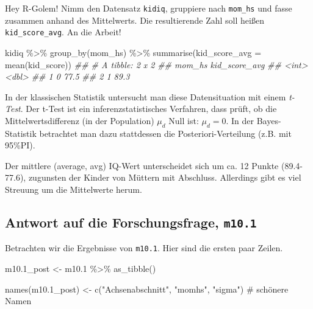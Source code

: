 \documentclass[
  a4paper,
  DIV=11]{scrreprt}
\newenvironment{Shaded}{\begin{snugshade}}{\end{snugshade}}
\newcommand{\AttributeTok}[1]{\textcolor[rgb]{0.40,0.45,0.13}{#1}}
\newcommand{\CommentTok}[1]{\textcolor[rgb]{0.37,0.37,0.37}{#1}}
\newcommand{\DocumentationTok}[1]{\textcolor[rgb]{0.37,0.37,0.37}{\textit{#1}}}
\newcommand{\FloatTok}[1]{\textcolor[rgb]{0.68,0.00,0.00}{#1}}
\newcommand{\FunctionTok}[1]{\textcolor[rgb]{0.28,0.35,0.67}{#1}}
\newcommand{\NormalTok}[1]{\textcolor[rgb]{0.00,0.23,0.31}{#1}}
\newcommand{\OtherTok}[1]{\textcolor[rgb]{0.00,0.23,0.31}{#1}}
\newcommand{\SpecialCharTok}[1]{\textcolor[rgb]{0.37,0.37,0.37}{#1}}
\newcommand{\StringTok}[1]{\textcolor[rgb]{0.13,0.47,0.30}{#1}}
\theoremstyle{definition}
\theoremstyle{remark}
\begin{document}
Hey R-Golem! Nimm den Datensatz \texttt{kidiq}, gruppiere nach
\texttt{mom\_hs} und fasse zusammen anhand des Mittelwerts. Die
resultierende Zahl soll heißen \texttt{kid\_score\_avg}. An die Arbeit!

\begin{Shaded}
\begin{Highlighting}[]
\NormalTok{kidiq }\SpecialCharTok{\%\textgreater{}\%} 
  \FunctionTok{group\_by}\NormalTok{(mom\_hs) }\SpecialCharTok{\%\textgreater{}\%} 
  \FunctionTok{summarise}\NormalTok{(}\AttributeTok{kid\_score\_avg =} 
              \FunctionTok{mean}\NormalTok{(kid\_score))}
\DocumentationTok{\#\# \# A tibble: 2 x 2}
\DocumentationTok{\#\#   mom\_hs kid\_score\_avg}
\DocumentationTok{\#\#    \textless{}int\textgreater{}         \textless{}dbl\textgreater{}}
\DocumentationTok{\#\# 1      0          77.5}
\DocumentationTok{\#\# 2      1          89.3}
\end{Highlighting}
\end{Shaded}

In der klassischen Statistik untersucht man diese Datensituation mit
einem \emph{t-Test}. Der t-Test ist ein inferenzstatistisches Verfahren,
dass prüft, ob die Mittelwertsdifferenz (in der Population) \(\mu_d\)
Null ist: \(\mu_d = 0\). In der Bayes-Statistik betrachtet man dazu
stattdessen die Posteriori-Verteilung (z.B. mit 95\%PI).

Der mittlere (average, avg) IQ-Wert unterscheidet sich um ca. 12 Punkte
(89.4-77.6), zugunsten der Kinder von Müttern mit Abschluss. Allerdings
gibt es viel Streuung um die Mittelwerte herum.

\hypertarget{antwort-auf-die-forschungsfrage-m10.1}{%
\subsection{\texorpdfstring{Antwort auf die Forschungsfrage,
\texttt{m10.1}}{Antwort auf die Forschungsfrage, m10.1}}\label{antwort-auf-die-forschungsfrage-m10.1}}

Betrachten wir die Ergebnisse von \texttt{m10.1}. Hier sind die ersten
paar Zeilen.

\begin{Shaded}
\begin{Highlighting}[]
\NormalTok{m10}\FloatTok{.1}\NormalTok{\_post }\OtherTok{\textless{}{-}}
\NormalTok{  m10}\FloatTok{.1} \SpecialCharTok{\%\textgreater{}\%} 
  \FunctionTok{as\_tibble}\NormalTok{() }

\FunctionTok{names}\NormalTok{(m10}\FloatTok{.1}\NormalTok{\_post) }\OtherTok{\textless{}{-}} \FunctionTok{c}\NormalTok{(}\StringTok{"Achsenabschnitt"}\NormalTok{, }\StringTok{"momhs"}\NormalTok{, }\StringTok{"sigma"}\NormalTok{)  }\CommentTok{\# schönere Namen}
\end{Highlighting}
\end{Shaded}
\end{document}
